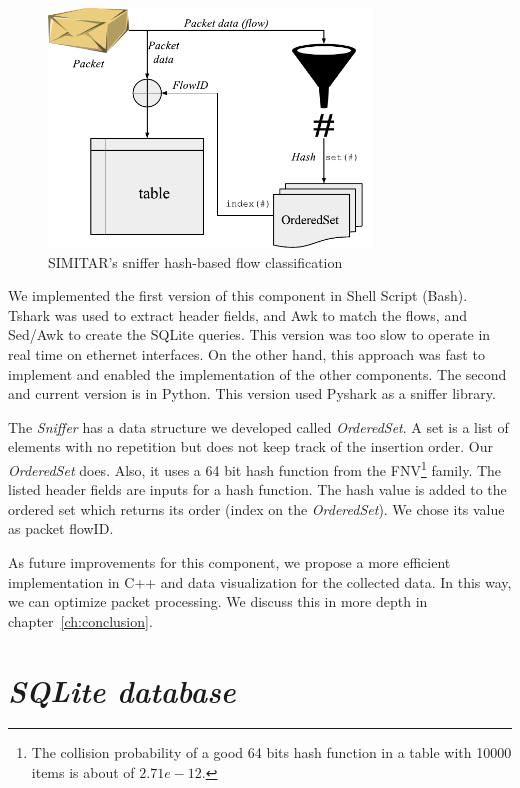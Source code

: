\begin{figure}[ht!]
        \centering
        \includegraphics[height=2.5in]{figures/ch3/sniffer-classifier}
        \caption{SIMITAR's sniffer hash-based flow classification}
    \label{fig:sniffer}
\end{figure}



We implemented the first version of this component in Shell Script (Bash). Tshark\cite{web-tshark} was used to extract header fields, and Awk to match the flows, and Sed/Awk to create the SQLite queries. This version was too slow to operate in real time on ethernet interfaces. On the other hand, this approach was fast to implement and enabled the implementation of the other components. The second and current version is in Python. This version used Pyshark\cite{web-pyshark} as a sniffer library.

The \textit{Sniffer} has a data structure we developed called \textit{OrderedSet}. A set is a list of elements with no repetition but does not keep track of the insertion order. Our \textit{OrderedSet} does. Also, it uses a 64 bit hash function from the \acrfull{FNV}\footnote{The collision probability of a good 64 bits hash function in a table with 10000 items is about of $2.71e-12$.} family. The listed header fields are inputs for a hash function. The hash value is added to the ordered set which returns its order (index on the \textit{OrderedSet}). We chose its value as packet \acrfull{flowID}.

As future improvements for this component, we propose a more efficient implementation in C++ and data visualization for the collected data. In this way, we can optimize packet processing. We discuss this in more depth in chapter~\ref{ch:conclusion}.

\section{ \textit{SQLite database} }

